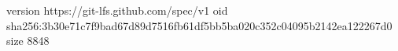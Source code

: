 version https://git-lfs.github.com/spec/v1
oid sha256:3b30e71c7f9bad67d89d7516fb61df5bb5ba020c352c04095b2142ea122267d0
size 8848

